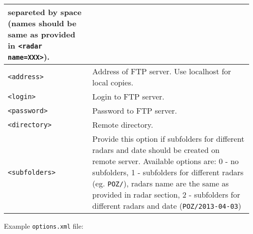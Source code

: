 \documentclass[11p]{article}
\begin{document}
\begin{longtable}{|l|p{9cm}|}
separeted by space (names should be same as provided in \texttt{<radar
name=XXX>}).\\
\hline \texttt{<address>}& Address of FTP server. Use localhost for local
copies.\\
\hline \texttt{<login>}& Login to FTP server. \\ 
\hline \texttt{<password>}& Password to FTP server. \\
\hline \texttt{<directory>}& Remote directory. \\
\hline \texttt{<subfolders>}& Provide this option if subfolders for different
radars and date should be created on remote server. Available options are: 0 -
no subfolders, 1 - subfolders for different radars (eg. \texttt{POZ/}), radars
name are the same as provided in radar section, 2 - subfolders for different radars and
date (\texttt{POZ/2013-04-03})
\\
\hline

\end{longtable}

Example \texttt{options.xml} file:
\end{document}
